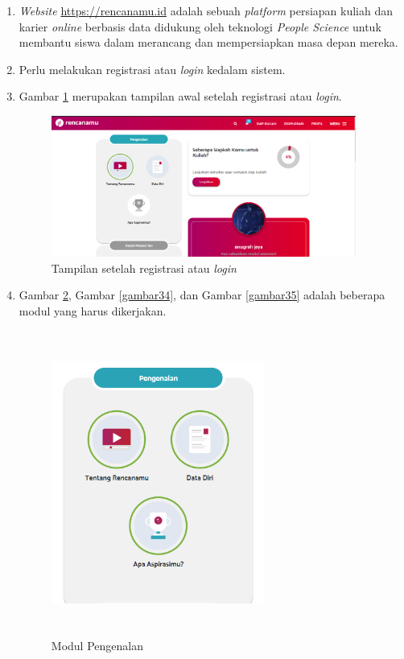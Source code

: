 \begin{enumerate}
    \item \textit{Website} \url{https://rencanamu.id} adalah sebuah \textit{platform} persiapan kuliah dan karier \textit{online} berbasis data didukung oleh teknologi \textit{People Science} untuk membantu siswa dalam merancang dan mempersiapkan masa depan mereka. 
    
    \item Perlu melakukan registrasi atau \textit{login} kedalam sistem.
    
    \item Gambar \ref{gambar32} merupakan tampilan awal setelah registrasi atau \textit{login}.
    
    \begin{figure}[H]
        \centering
        \includegraphics[width = 10cm, height = 6 cm]{doc/DokumenSkripsi/Gambar/gambar32.PNG}
        \caption{Tampilan setelah registrasi atau \textit{login}}
        \label{gambar32}
    \end{figure}
    
    \item Gambar \ref{gambar33}, Gambar \ref{gambar34}, dan Gambar \ref{gambar35} adalah beberapa modul yang harus dikerjakan.
    
    \begin{figure}[H]
        \centering
        \includegraphics[width = 7cm, height = 10cm ]{doc/DokumenSkripsi/Gambar/gambar33.PNG}
        \caption{Modul Pengenalan}
        \label{gambar33}
    \end{figure}
    

\end{enumerate}
